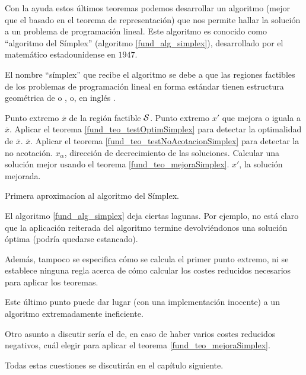 Con la ayuda estos últimos teoremas podemos desarrollar un algoritmo (mejor que el basado en el teorema de representación) que nos permite hallar la solución a un problema de programación lineal. Este algoritmo es conocido como ``algoritmo del Símplex'' (algoritmo \ref{fund_alg_simplex}), desarrollado por el matemático estadounidense  en $1947$.
\begin{obs}
	El nombre ``símplex'' que recibe el algoritmo se debe a que las regiones factibles de los problemas de programación lineal en forma estándar tienen estructura geométrica de  o , o, en inglés .
\end{obs}
\begin{algorithm}[H]
	\begin{algorithmic}[1]
		\REQUIRE Punto extremo $\overline{x}$ de la región factible $\mathcal{S}$.
		\ENSURE Punto extremo $x'$ que mejora o iguala a $\overline{x}$.
		\STATE Aplicar el teorema \ref{fund_teo_testOptimSimplex} para detectar la optimalidad de $\overline{x}$.
		\RETURN $\overline{x}$.
		\ELSE 
		\STATE Aplicar el teorema \ref{fund_teo_testNoAcotacionSimplex} para detectar la no acotación.
			\RETURN $x_\alpha$, dirección de decrecimiento de las soluciones.
			\ELSE
			\STATE Calcular una solución mejor usando el teorema \ref{fund_teo_mejoraSimplex}.
			\RETURN $x'$, la solución mejorada.
			\ENDIF
		\ENDIF	
	\end{algorithmic}
	\caption{Primera aproximacíon al algoritmo del Símplex.}\label{fund_alg_simplex}
\end{algorithm}
\begin{obs}
	El algoritmo \ref{fund_alg_simplex} deja ciertas lagunas. Por ejemplo, no está claro que la aplicación reiterada del algoritmo termine devolviéndonos una solución óptima (podría quedarse estancado).
	
	Además, tampoco se especifica cómo se calcula el primer punto extremo, ni se establece ninguna regla acerca de cómo calcular los costes reducidos necesarios para aplicar los teoremas.
	
	Este último punto puede dar lugar (con una implementación inocente) a un algoritmo extremadamente ineficiente.
	
	Otro asunto a discutir sería el de, en caso de haber varios costes reducidos negativos, cuál elegir para aplicar el teorema \ref{fund_teo_mejoraSimplex}.
\end{obs}
Todas estas cuestiones se discutirán en el capítulo siguiente.
